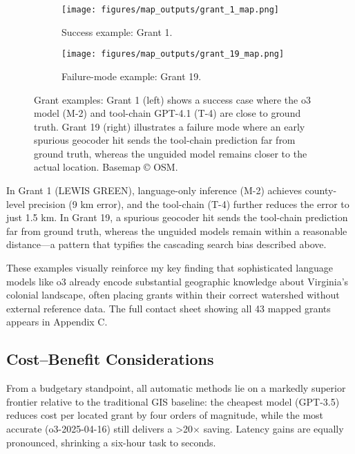 \begin{figure}[H]
\centering
\begin{subfigure}{0.48\textwidth}
  \centering
  \texttt{[image: figures/map\_outputs/grant\_1\_map.png]}
  \caption{Success example: Grant 1.}
  \label{fig:grant1}
\end{subfigure}
\hfill %
\begin{subfigure}{0.48\textwidth}
  \centering
  \texttt{[image: figures/map\_outputs/grant\_19\_map.png]}
  \caption{Failure-mode example: Grant 19.}
  \label{fig:grant19}
\end{subfigure}
\caption{Grant examples: Grant 1 (left) shows a success case where the o3 model (M-2) and tool-chain GPT-4.1 (T-4) are close to ground truth. Grant 19 (right) illustrates a failure mode where an early spurious geocoder hit sends the tool-chain prediction far from ground truth, whereas the unguided model remains closer to the actual location. Basemap © OSM.}
\label{fig:grant_maps}
\end{figure}

In Grant 1 (LEWIS GREEN), language-only inference (M-2) achieves
county-level precision (9 km error), and the tool-chain (T-4) further
reduces the error to just 1.5 km. In Grant 19, a spurious geocoder hit
sends the tool-chain prediction far from ground truth, whereas the
unguided models remain within a reasonable distance---a pattern that
typifies the cascading search bias described above.

These examples visually reinforce my key finding that sophisticated
language models like o3 already encode substantial geographic knowledge
about Virginia's colonial landscape, often placing grants within their
correct watershed without external reference data. The full contact
sheet showing all 43 mapped grants appears in Appendix C.

\subsection{Cost--Benefit
Considerations}\label{costbenefit-considerations}

From a budgetary standpoint, all automatic methods lie on a markedly
superior frontier relative to the traditional GIS baseline: the cheapest
model (GPT-3.5) reduces cost per located grant by four orders of
magnitude, while the most accurate (o3-2025-04-16) still delivers a
\textgreater20× saving. Latency gains are equally pronounced, shrinking
a six-hour task to seconds.


